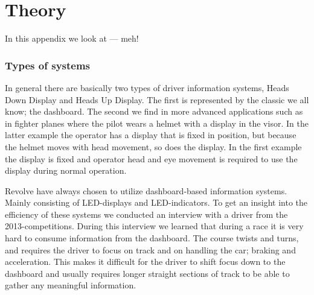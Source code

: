 
\chapter{Theory}

In this appendix we look at --- meh!

\subsection{Types of systems}
In general there are basically two types of driver information systems, Heads Down Display and Heads Up Display. 
The first is represented by the classic we all know; the dashboard. The second we find in more advanced 
applications such as in fighter planes where the pilot wears a helmet with a display in the visor. In the latter 
example the operator has a display that is fixed in position, but because the helmet moves with head movement, so does
the display. In the first example the display is fixed and operator head and eye movement is required to use the display during normal
operation.

Revolve have always chosen to utilize dashboard-based information systems. Mainly consisting of LED-displays and 
LED-indicators. To get an insight into the efficiency of these systems we conducted an interview with a driver 
from the 2013-competitions. During this interview we learned that during a race it is very hard to consume
information from the dashboard. The course twists and turns, and requires the driver to focus on track and on handling the car; braking and 
acceleration. This makes it difficult for the driver to shift focus down to the dashboard and usually requires longer straight sections of
track to be able to gather any meaningful information.





